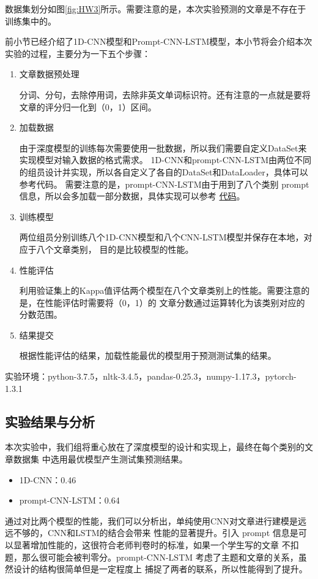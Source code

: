 \documentclass[UTF8]{article}
\begin{document}
数据集划分如图\ref{fig:HW3}所示。需要注意的是，本次实验预测的文章是不存在于训练集中的。

前小节已经介绍了1D-CNN模型和Prompt-CNN-LSTM模型，本小节将会介绍本次实验的过程，主要分为一下五个步骤：
\begin{enumerate}
    \item 文章数据预处理

    分词、分句，去除停用词，去除非英文单词标识符。还有注意的一点就是要将文章的评分归一化到（0，1）区间。
    \item 加载数据
    
    由于深度模型的训练每次需要使用一批数据，所以我们需要自定义DataSet来实现模型对输入数据的格式需求。
    1D-CNN和prompt-CNN-LSTM由两位不同的组员设计并实现，所以各自定义了各自的DataSet和DataLoader，具体可以参考代码。
    需要注意的是，prompt-CNN-LSTM由于用到了八个类别 prompt 信息，所以会多加载一部分数据，具体实现可以参考
    \href{https://github.com/Mandule/EssayAE/tree/master/HW3}{代码}。
    \item 训练模型
    
    两位组员分别训练八个1D-CNN模型和八个CNN-LSTM模型并保存在本地，对应于八个文章类别，
    目的是比较模型的性能。
    \item 性能评估
    
    利用验证集上的Kappa值评估两个模型在八个文章类别上的性能。需要注意的是，在性能评估时需要将（0，1）的
    文章分数通过运算转化为该类别对应的分数范围。
    \item 结果提交
    
    根据性能评估的结果，加载性能最优的模型用于预测测试集的结果。
\end{enumerate}

实验环境：python-3.7.5，nltk-3.4.5，pandas-0.25.3，numpy-1.17.3，pytorch-1.3.1

\subsection{实验结果与分析}

本次实验中，我们组将重心放在了深度模型的设计和实现上，最终在每个类别的文章数据集
中选用最优模型产生测试集预测结果。

\begin{itemize}
    \item 1D-CNN：0.46
    \item prompt-CNN-LSTM：0.64
\end{itemize}

通过对比两个模型的性能，我们可以分析出，单纯使用CNN对文章进行建模是远远不够的，CNN和LSTM的结合会带来
性能的显著提升。引入 prompt 信息是可以显著增加性能的，这很符合老师判卷时的标准，如果一个学生写的文章
不扣题，那么很可能会被判零分。prompt-CNN-LSTM 考虑了主题和文章的关系，虽然设计的结构很简单但是一定程度上
捕捉了两者的联系，所以性能得到了提升。
\end{document}
